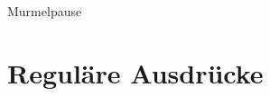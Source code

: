 \documentclass[10pt]{beamer}
\begin{document}
        
    
        
        



\begin{frame}[standout]
  Murmelpause
\end{frame}

\section{Reguläre Ausdrücke}
\end{document}
